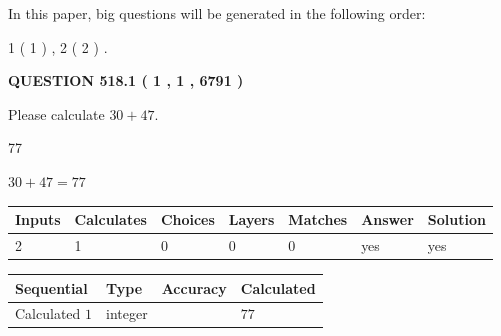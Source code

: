 \documentclass[12pt]{article}
\begin{document}
In this paper, big questions will be generated in the following order: 
   
   
   1 ( 1 )
 ,
   2 ( 2 )
 .
  
\vspace{0.2in}
  
{\textbf{\Large{QUESTION
518.1 
 ( 1 , 1 , 6791 )
}}}
  
  
 
Please calculate $ %
30 +  %
47 $.
 
 
 
\noindent{}
 
 

77
 
 
\noindent{}
 
 

 
 
 
\noindent{}
 
 

$ %
30 +  %
47=   %
77$
 
 
\noindent{}
 
 

 
   
   
   
   
\noindent\begin{tabular}{|l|l|l|l|l|l|l|}
 \hline
Inputs & Calculates & Choices & Layers & Matches & Answer & Solution \\ \hline
 2  & 
 1  & 
 0
  & 
 0  & 
 0  & 
  yes & 
  yes 
  \\ \hline
 \end{tabular}
   
   
   
   
\noindent{}
   
   
  
  
\noindent\begin{tabular}{|l|l|l|l|}
\hline
 Sequential & Type & Accuracy & Calculated \\ 
\hline
 
 
  Calculated $  1 $ & integer &  & 
  $ 77 $ 
 \\  \hline  
 \end{tabular}
   
\end{document}
